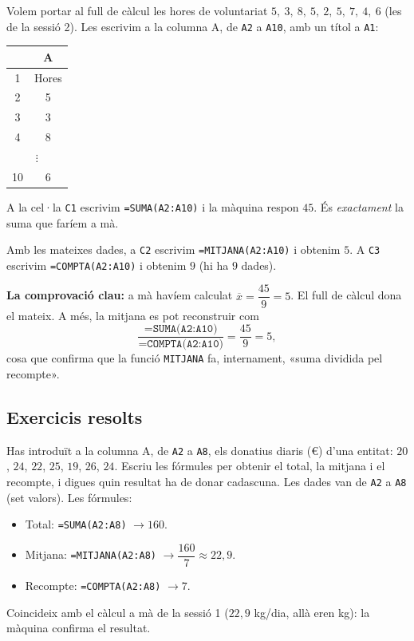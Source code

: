\begin{exemple}
Volem portar al full de càlcul les hores de voluntariat $5,\ 3,\ 8,\ 5,\ 2,\ 5,\ 7,\ 4,\ 6$
(les de la sessió 2). Les escrivim a la columna A, de \texttt{A2} a \texttt{A10},
amb un títol a \texttt{A1}:

\begin{center}
\begin{tabular}{c|c}
 & \textbf{A} \\
\hline
1 & Hores \\
2 & 5 \\
3 & 3 \\
4 & 8 \\
\multicolumn{2}{c}{\quad$\vdots$\quad} \\
10 & 6 \\
\end{tabular}
\end{center}

A la cel·la \texttt{C1} escrivim \texttt{=SUMA(A2:A10)} i la màquina respon $45$.
És \emph{exactament} la suma que faríem a mà.
\end{exemple}

\begin{exemple}
Amb les mateixes dades, a \texttt{C2} escrivim \texttt{=MITJANA(A2:A10)} i obtenim
$5$. A \texttt{C3} escrivim \texttt{=COMPTA(A2:A10)} i obtenim $9$ (hi ha $9$ dades).

\textbf{La comprovació clau:} a mà havíem calculat $\overline{x}=\dfrac{45}{9}=5$. El
full de càlcul dona el mateix. A més, la mitjana es pot reconstruir com
\[
\frac{\texttt{=SUMA(A2:A10)}}{\texttt{=COMPTA(A2:A10)}}=\frac{45}{9}=5,
\]
cosa que confirma que la funció \texttt{MITJANA} fa, internament, «suma dividida pel
recompte».
\end{exemple}

\subsection{Exercicis resolts}

\begin{exresolt}
Has introduït a la columna A, de \texttt{A2} a \texttt{A8}, els donatius diaris (€)
d'una entitat: $20$, $24$, $22$, $25$, $19$, $26$, $24$. Escriu les fórmules per
obtenir el total, la mitjana i el recompte, i digues quin resultat ha de donar
cadascuna.
\solucio
Les dades van de \texttt{A2} a \texttt{A8} (set valors). Les fórmules:
\begin{itemize}[leftmargin=1.4em, itemsep=1pt]
  \item Total: \texttt{=SUMA(A2:A8)} $\rightarrow 160$.
  \item Mitjana: \texttt{=MITJANA(A2:A8)} $\rightarrow \dfrac{160}{7}\approx 22,9$.
  \item Recompte: \texttt{=COMPTA(A2:A8)} $\rightarrow 7$.
\end{itemize}
Coincideix amb el càlcul a mà de la sessió 1 ($22,9$ kg/dia, allà eren kg): la
màquina confirma el resultat.
\end{exresolt}

